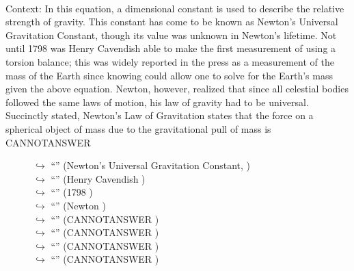 \documentclass[11pt,a4paper, onecolumn]{article}
\begin{document}
\\ Context: In this equation, a dimensional constant  is used to describe the relative strength of gravity. This constant has come to be known as Newton's Universal Gravitation Constant, though its value was unknown in Newton's lifetime. Not until 1798 was Henry Cavendish able to make the first measurement of  using a torsion balance; this was widely reported in the press as a measurement of the mass of the Earth since knowing  could allow one to solve for the Earth's mass given the above equation. Newton, however, realized that since all celestial bodies followed the same laws of motion, his law of gravity had to be universal. Succinctly stated, Newton's Law of Gravitation states that the force on a spherical object of mass  due to the gravitational pull of mass  is CANNOTANSWER

\begin{figure}[t] \small \begin{tcolorbox}[boxsep=0pt,left=5pt,right=0pt,top=2pt,colback = yellow!5] \begin{dialogue}
 \small 
\colorbox{pink!25}{$\hookrightarrow$}
{ ``'' (Newton's Universal Gravitation Constant, ) }
\\
\colorbox{pink!25}{$\hookrightarrow$}
{ ``'' (Henry Cavendish ) }
\\
\colorbox{pink!25}{$\hookrightarrow$}
{ ``'' (1798 ) }
\\
\colorbox{pink!25}{$\hookrightarrow$}
{ ``'' (Newton ) }
\\
\colorbox{pink!25}{$\hookrightarrow$}
{ ``'' (CANNOTANSWER ) }
\\
\colorbox{pink!25}{$\hookrightarrow$}
{ ``'' (CANNOTANSWER ) }
\\
\colorbox{pink!25}{$\hookrightarrow$}
{ ``'' (CANNOTANSWER ) }
\\
\colorbox{pink!25}{$\hookrightarrow$}
{ ``'' (CANNOTANSWER ) }
\\
 \end{dialogue}\end{tcolorbox}\end{figure}
\end{document}
